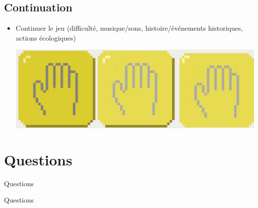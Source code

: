 \documentclass[11pt]{beamer}
\newcommand{\pauseditemize}{\pause \begin{itemize}[<+->]}
\begin{document}
\subsection{Continuation}

\begin{frame}

\pauseditemize
	\item Continuer le jeu (difficulté, musique/sons, histoire/événements historiques, actions écologiques)
	\begin{center} 
		\includegraphics[scale=.08]{../images/ecoActions} 
	\end{center}
\end{itemize}

\end{frame}

\section{Questions}

\begin{frame}{Questions}
	\begin{center}
	{\LARGE Questions}
	\end{center}
\end{frame}
\end{document}
